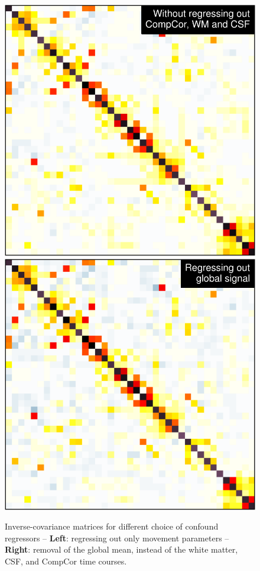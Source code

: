 \documentclass[5p]{elsarticle}
\begin{document}
\begin{figure}
\includegraphics[height=.499\linewidth]{group_l21_prec_no_confounds.pdf}%
\hfill%
\includegraphics[height=.499\linewidth]{group_l21_prec_global_mean.pdf}%

\caption{Inverse-covariance matrices for different choice of
confound regressors --
\label{fig:icov_regressors}
\textbf{Left}: regressing out only movement parameters --
\textbf{Right}: removal of the global mean,
instead of the white matter, CSF, and CompCor time courses. 
}
\end{figure}
\end{document}
